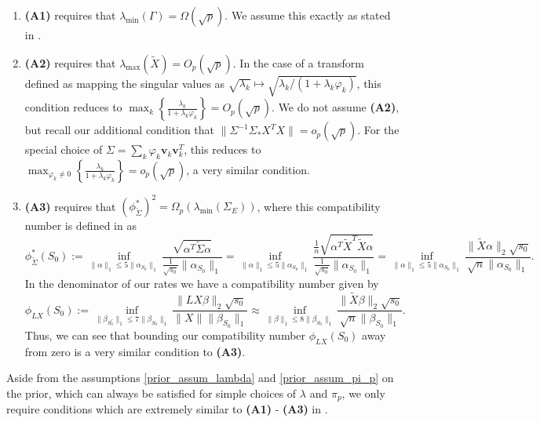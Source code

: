 \documentclass[11pt]{article}
\newcommand{\postCov}{\Sigma_*}
\begin{document}
\begin{enumerate}
	\item {\bf (A1)} requires that $\lambda_{\min}(\Gamma) = \Omega(\sqrt{p})$. We assume this exactly as stated in \cite{CBM2020}.
	\item {\bf (A2)} requires that $\lambda_{\max}(\tilde{X}) = O_p(\sqrt{p})$. In the case of a transform defined as mapping the singular values as $\sqrt{\lambda_k} \mapsto \sqrt{\lambda_k/(1+\lambda_k \varphi_k)}$, this condition reduces to $\max_{k}\left\{\frac{\lambda_k}{1+\lambda_k \varphi_k} \right\} = O_p(\sqrt{p})$. We do not assume {\bf (A2)}, but recall our additional condition that $\|\Sigma^{-1} \postCov  X^T X\|= o_p(\sqrt{p})$. For the special choice of $\Sigma = \sum_k \varphi_k \mathbf{v}_k \mathbf{v}_k^T$, this reduces to $\max_{\varphi_k \neq 0}\left\{\frac{\lambda_k}{1+\lambda_k \varphi_k} \right\} = o_p(\sqrt{p})$, a very similar condition.
	\item {\bf (A3)} requires that $(\phi_{\tilde{\Sigma}}^*)^2  = \Omega_p(\lambda_{\min}(\Sigma_E))$, where this compatibility number is defined in \cite{CBM2020} as
		$$
		\phi_{\tilde{\Sigma}}^*(S_0) := \inf_{\|\alpha\|_1 \leq 5\|\alpha_{S_0}\|_1 } \frac{\sqrt{\alpha^T \tilde{\Sigma} \alpha}}{\frac{1}{\sqrt{s_0}}\|\alpha_{S_0}\|_1} = \inf_{\|\alpha\|_1 \leq 5\|\alpha_{S_0}\|_1 } \frac{\frac{1}{n}\sqrt{\alpha^T \tilde{X}^T \tilde{X} \alpha}}{\frac{1}{\sqrt{s_0}}\|\alpha_{S_0}\|_1}  = \inf_{\|\alpha\|_1 \leq 5\|\alpha_{S_0}\|_1 } \frac{\|\tilde{X}\alpha\|_2 \sqrt{s_0}}{\sqrt{n}\|\alpha_{S_0}\|_1}.
		$$ 
		In the denominator of our rates we have a compatibility number given by
		$$
		\phi_{LX}(S_0) := \inf_{ \| \beta_{S_0^c}\|_1 \leq7\|\beta_{S_0} \|_1} \frac{\|LX \beta\|_2 \sqrt{s_0}}{\|X\|\|\beta_{S_0}\|_1} \approx  \inf_{ \| \beta\|_1 \leq 8\|\beta_{S_0} \|_1} \frac{\|\tilde{X} \beta\|_2 \sqrt{s_0}}{\sqrt{n} \|\beta_{S_0}\|_1}.
		$$
		Thus, we can see that bounding our compatibility number $\phi_{LX}(S_0)$ away from zero is a very similar condition to {\bf (A3)}.
\end{enumerate}

Aside from the assumptions \eqref{prior_assum_lambda} and \eqref{prior_assum_pi_p} on the prior, which can always be satisfied for simple choices of $\lambda$ and $\pi_p$, we only require conditions which are extremely similar to {\bf (A1)} - {\bf (A3)} in \cite{CBM2020}.
\end{document}
